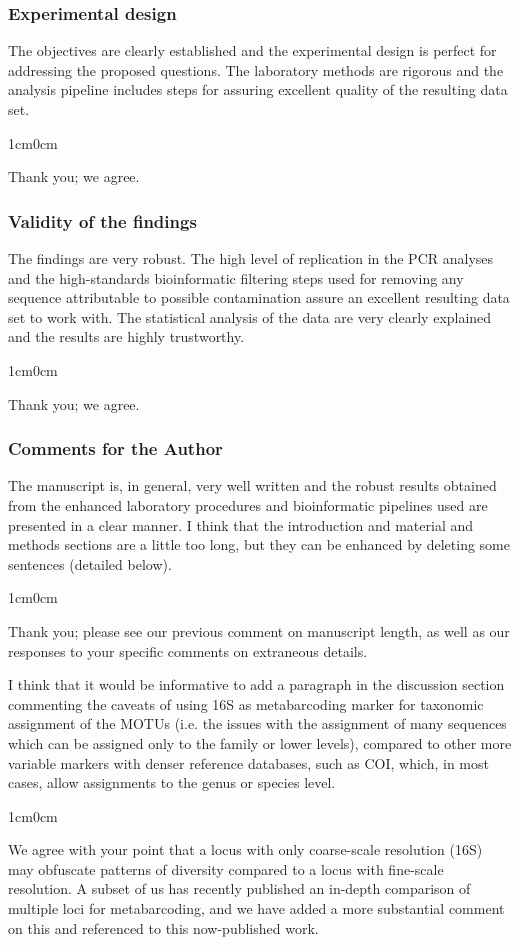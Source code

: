 \documentclass{article}
\newenvironment{response}
	{
	\begin{adjustwidth}{1cm}{0cm}
	\color{peerjBlue}
	}
	{
	\end{adjustwidth}
	}
\begin{document}
\subsubsection*{Experimental design}
The objectives are clearly established and the experimental design is perfect for addressing the proposed questions. The laboratory methods are rigorous and the analysis pipeline includes steps for assuring excellent quality of the resulting data set.
\begin{response}
	Thank you; we agree.\\
\end{response}

\subsubsection*{Validity of the findings}
The findings are very robust. The high level of replication in the PCR analyses and the high-standards bioinformatic filtering steps used for removing any sequence attributable to possible contamination assure an excellent resulting data set to work with. The statistical analysis of the data are very clearly explained and the results are highly trustworthy.
\begin{response}
	Thank you; we agree.\\
\end{response}

\subsubsection*{Comments for the Author}
The manuscript is, in general, very well written and the robust results obtained from the enhanced laboratory procedures and bioinformatic pipelines used are presented in a clear manner. I think that the introduction and material and methods sections are a little too long, but they can be enhanced by deleting some sentences (detailed below).
\begin{response}
	Thank you; please see our previous comment on manuscript length, as well as our responses to your specific comments on extraneous details.\\
\end{response}


I think that it would be informative to add a paragraph in the discussion section commenting the caveats of using 16S as metabarcoding marker for taxonomic assignment of the MOTUs (i.e. the issues with the assignment of many sequences which can be assigned only to the family or lower levels), compared to other more variable markers with denser reference databases, such as COI, which, in most cases, allow assignments to the genus or species level.
\begin{response}
	We agree with your point that a locus with only coarse-scale resolution (16S) may obfuscate patterns of diversity compared to a locus with fine-scale resolution. A subset of us has recently published an in-depth comparison of multiple loci for metabarcoding, and we have added a more substantial comment on this and referenced to this now-published work.
\\
\end{response}
\end{document}
